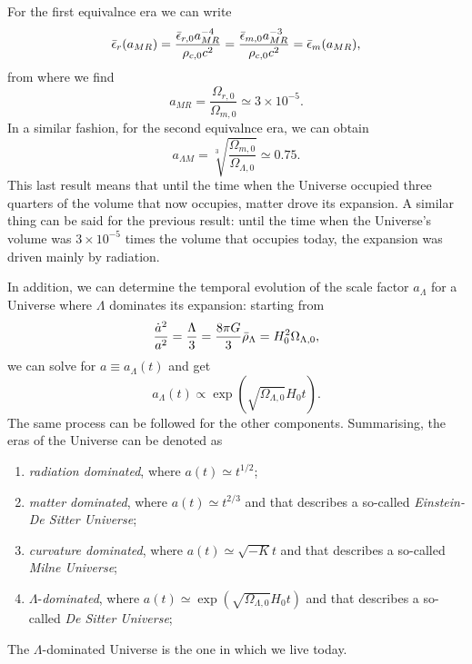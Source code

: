 For the first equivalnce era we can write 
\begin{equation}
    \bar{\epsilon}_r(a_{MR}) = \frac{\bar{\epsilon}_{r,0}a_{MR}^{-4}}{\rho_{c,0}c^2} = \frac{\bar{\epsilon}_{m,0}a_{MR}^{-3}}{\rho_{c,0}c^2} = \bar{\epsilon}_m(a_{MR}),
\end{equation}
from where we find 
\begin{equation}
    a_{MR} = \frac{\Omega_{r,0}}{\Omega_{m,0}} \simeq 3 \times 10^{-5}.
\end{equation}
In a similar fashion, for the second equivalnce era, we can obtain
\begin{equation}
    a_{\Lambda M} = \sqrt[3]{\frac{\Omega_{m,0}}{\Omega_{\Lambda,0}}} \simeq 0.75.
\end{equation}
This last result means that until the time when the Universe occupied three quarters of the volume that now occupies, matter drove its expansion. A similar thing can be said for the previous result: until the time when the Universe's volume was $3 \times 10^{-5}$ times the volume that occupies today, the expansion was driven mainly by radiation. 

In addition, we can determine the temporal evolution of the scale factor $a_\Lambda$ for a Universe where $\Lambda$ dominates its expansion: starting from
\begin{equation}
    \frac{\dot{a}^2}{a^2} = \frac{\Lambda}{3} = \frac{8\pi G}{3}\bar{\rho}_\Lambda = H_0^2\Omega_{\Lambda,0},
\end{equation}
we can solve for $a \equiv a_\Lambda(t)$ and get
\begin{equation}
    a_\Lambda(t) \propto \exp{(\sqrt{\Omega_{\Lambda,0}}H_0t)}.
\end{equation}
The same process can be followed for the other components. Summarising, the eras of the Universe can be denoted as 
\begin{enumerate}
    \item \emph{radiation dominated}, where $a(t) \simeq t^{1/2}$;
    \item \emph{matter dominated}, where $a(t) \simeq t^{2/3}$ and that describes a so-called \emph{Einstein-De Sitter Universe};
    \item \emph{curvature dominated}, where $a(t) \simeq \sqrt{-K}t$ and that describes a so-called \emph{Milne Universe};
    \item $\Lambda$-\emph{dominated}, where $a(t) \simeq \exp{(\sqrt{\Omega_{\Lambda,0}}H_0t)}$ and that describes a so-called \emph{De Sitter Universe};
\end{enumerate}
The $\Lambda$-dominated Universe is the one in which we live today. 

